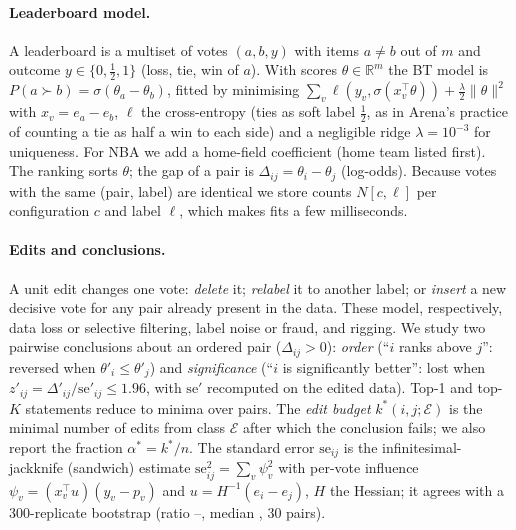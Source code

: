 \documentclass{article}
\newcommand{\kstar}{k^\ast}
\begin{document}
\paragraph{Leaderboard model.} A leaderboard is a multiset of votes $(a,b,y)$ with items $a\neq b$ out of $m$ and outcome $y\in\{0,\tfrac12,1\}$ (loss, tie, win of $a$). With scores $\theta\in\mathbb{R}^m$ the BT model is $P(a\succ b)=\sigma(\theta_a-\theta_b)$, fitted by minimising $\sum_v \ell(y_v,\sigma(x_v^\top\theta))+\tfrac{\lambda}{2}\|\theta\|^2$ with $x_v=e_a-e_b$, $\ell$ the cross-entropy (ties as soft label $\tfrac12$, as in Arena's practice of counting a tie as half a win to each side) and a negligible ridge $\lambda=10^{-3}$ for uniqueness. For NBA we add a home-field coefficient (home team listed first). The ranking sorts $\theta$; the gap of a pair is $\Delta_{ij}=\theta_i-\theta_j$ (log-odds). Because votes with the same (pair, label) are identical we store counts $N[c,\ell]$ per configuration $c$ and label $\ell$, which makes fits a few milliseconds.

\paragraph{Edits and conclusions.} A unit edit changes one vote: \emph{delete} it; \emph{relabel} it to another label; or \emph{insert} a new decisive vote for any pair already present in the data. These model, respectively, data loss or selective filtering, label noise or fraud, and rigging. We study two pairwise conclusions about an ordered pair ($\Delta_{ij}>0$): \emph{order} (``$i$ ranks above $j$'': reversed when $\theta'_i\le\theta'_j$) and \emph{significance} (``$i$ is significantly better'': lost when $z'_{ij}=\Delta'_{ij}/\mathrm{se}'_{ij}\le 1.96$, with $\mathrm{se}'$ recomputed on the edited data). Top-1 and top-$K$ statements reduce to minima over pairs. The \emph{edit budget} $\kstar(i,j;\mathcal{E})$ is the minimal number of edits from class $\mathcal{E}$ after which the conclusion fails; we also report the fraction $\alpha^\ast=\kstar/n$. The standard error $\mathrm{se}_{ij}$ is the infinitesimal-jackknife (sandwich) estimate $\mathrm{se}_{ij}^2=\sum_v\psi_v^2$ with per-vote influence $\psi_v=(x_v^\top u)(y_v-p_v)$ and $u=H^{-1}(e_i-e_j)$, $H$ the Hessian; it agrees with a 300-replicate bootstrap (ratio \Nseratiomin--\Nseratiomax, median \Nseratiomed, 30 pairs).
\end{document}
